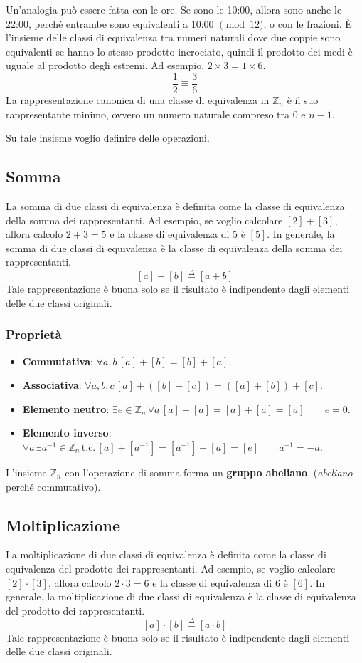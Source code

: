 Un'analogia può essere fatta con le ore. Se sono le 10:00, allora sono anche le 22:00,
perché entrambe sono equivalenti a 10:00 $\pmod{12}$, o con le frazioni. È l'insieme 
delle classi di equivalenza tra numeri naturali dove due coppie sono 
equivalenti se hanno lo stesso prodotto incrociato, quindi il prodotto 
dei medi è uguale al prodotto degli estremi. Ad esempio, $2 \times 3 = 1 \times 6$. 
\[
  \frac{1}{2} \equiv \frac{3}{6}
\]
La rappresentazione canonica di una classe di equivalenza in $\mathbb{Z}_n$ è il suo
rappresentante minimo, ovvero un numero naturale compreso tra 0 e $n-1$.

Su tale insieme voglio definire delle operazioni.
\subsection{Somma}
La somma di due classi di equivalenza è definita come la classe di
equivalenza della somma dei rappresentanti. Ad esempio, se voglio
calcolare $[2] + [3]$, allora calcolo $2 + 3 = 5$ e la classe di equivalenza
di 5 è $[5]$. In generale, la somma di due classi di equivalenza è la classe
di equivalenza della somma dei rappresentanti.
\[
  [a] + [b] \stackrel{\Delta}{=} [a + b]
\]
Tale rappresentazione è buona solo se il risultato è indipendente dagli elementi 
delle due classi originali.
\subsubsection{Proprietà}
\begin{itemize}
  \item \textbf{Commutativa}: $\forall a, b \,[a] + [b] = [b] + [a]$.
  \item \textbf{Associativa}: $\forall a, b, c \,[a] + ([b] + [c]) = ([a] + [b]) + [c]$.
  \item \textbf{Elemento neutro}: $\exists e \in \mathbb{Z}_n \, \forall a \, [a] + [a] = [a] + [a] = [a]\qquad e = 0$.
  \item \textbf{Elemento inverso}: $\forall a \, \exists a^{-1} \in \mathbb{Z}_n \,
  \text{t.c.} \, [a] + [a^{-1}] = [a^{-1}] + [a] = [e] \qquad a^{-1} = -a$.
\end{itemize}
L'insieme $\mathbb{Z}_n$ con l'operazione di somma forma un \textbf{gruppo abeliano}, 
(\textit{abeliano} perché commutativo).
\subsection{Moltiplicazione}
La moltiplicazione di due classi di equivalenza è definita come la classe di
equivalenza del prodotto dei rappresentanti. Ad esempio, se voglio
calcolare $[2] \cdot [3]$, allora calcolo $2 \cdot 3 = 6$ e la classe di equivalenza
di 6 è $[6]$. In generale, la moltiplicazione di due classi di equivalenza è la classe
di equivalenza del prodotto dei rappresentanti.
\[
  [a] \cdot [b] \stackrel{\Delta}{=} [a \cdot b]
\]
Tale rappresentazione è buona solo se il risultato è indipendente dagli elementi
delle due classi originali.
